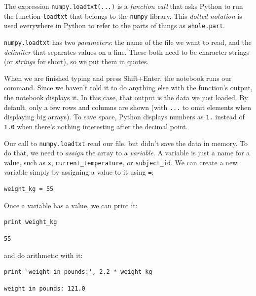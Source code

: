 \documentclass[]{book}
\newcommand{\gdef}[2]{\emph{#2}}
\begin{document}
The expression \texttt{numpy.loadtxt(...)} is a
\gdef{g:function-call}{function call} that asks Python to run the
function \texttt{loadtxt} that belongs to the \texttt{numpy} library.
This \gdef{g:dotted-notation}{dotted notation} is used everywhere in
Python to refer to the parts of things as \texttt{whole.part}.

\texttt{numpy.loadtxt} has two \gdef{g:parameter}{parameters}: the
name of the file we want to read, and the
\gdef{g:delimiter}{delimiter} that separates values on a line. These
both need to be character strings (or \gdef{g:string}{strings} for
short), so we put them in quotes.

When we are finished typing and press Shift+Enter, the notebook runs our
command. Since we haven't told it to do anything else with the
function's output, the notebook displays it. In this case, that output
is the data we just loaded. By default, only a few rows and columns are
shown (with \texttt{...} to omit elements when displaying big arrays).
To save space, Python displays numbers as \texttt{1.} instead of
\texttt{1.0} when there's nothing interesting after the decimal point.

Our call to \texttt{numpy.loadtxt} read our file, but didn't save the
data in memory. To do that, we need to \gdef{g:assignment}{assign}
the array to a \gdef{g:variable}{variable}. A variable is just a
name for a value, such as \texttt{x}, \texttt{current\_temperature}, or
\texttt{subject\_id}. We can create a new variable simply by assigning a
value to it using \texttt{=}:

\begin{verbatim}
weight_kg = 55
\end{verbatim}

Once a variable has a value, we can print it:

\begin{verbatim}
print weight_kg
\end{verbatim}

\begin{verbatim}
55
\end{verbatim}

and do arithmetic with it:

\begin{verbatim}
print 'weight in pounds:', 2.2 * weight_kg
\end{verbatim}

\begin{verbatim}
weight in pounds: 121.0
\end{verbatim}
\end{document}
